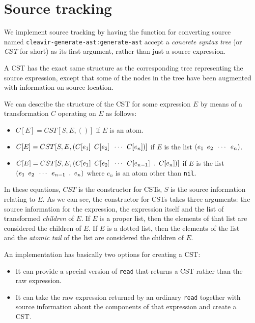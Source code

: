 \chapter{Source tracking}

We implement source tracking by having the function for converting
source named \texttt{cleavir-generate-ast:generate-ast} accept a
\emph{concrete syntax tree} (or \emph{CST} for short) as its first
argument, rather than just a source expression.

A CST has the exact same structure as the corresponding tree
representing the source expression, except that some of the nodes in
the tree have been augmented with information on source location.

We can describe the structure of the CST for some expression $E$ by
means of a transformation $C$ operating on $E$ as follows:

\begin{itemize}
\item $C[E] = CST[S, E, ()]$ if $E$ is an atom.
\item $C[E] = CST[S, E,
  (C[e_1]\enskip{}C[e_2]\enskip{}\cdots\enskip{}C[e_n])]$ if $E$ is
  the list $(e_1\enskip{}e_2\enskip{}\cdots\enskip{}e_n)$.
\item $C[E] = CST[S, E,
  (C[e_1]\enskip{}C[e_2]\enskip{}\cdots\enskip{}C[e_{n-1}]\enskip{}.\enskip{}C[e_n])]$
  if $E$ is the list
  $(e_1\enskip{}e_2\enskip{}\cdots\enskip{}e_{n-1}\enskip{}.\enskip{}e_n)$
  where $e_n$ is an atom other than \texttt{nil}.
\end{itemize}

In these equations, $CST$ is the constructor for CSTs, $S$ is the
source information relating to $E$.  As we can see, the constructor
for CSTs takes three arguments: the source information for the
expression, the expression itself and the list of transformed
\emph{children} of $E$.  If $E$ is a proper list, then the elements of
that list are considered the children of $E$.  If $E$ is a dotted
list, then the elements of the list and the \emph{atomic tail} of the
list are considered the children of $E$.

An implementation has basically two options for creating a CST:

\begin{itemize}
\item It can provide a special version of \texttt{read} that returns a
  CST rather than the raw expression.
\item It can take the raw expression returned by an ordinary
  \texttt{read} together with source information about the components
  of that expression and create a CST. 
\end{itemize}


